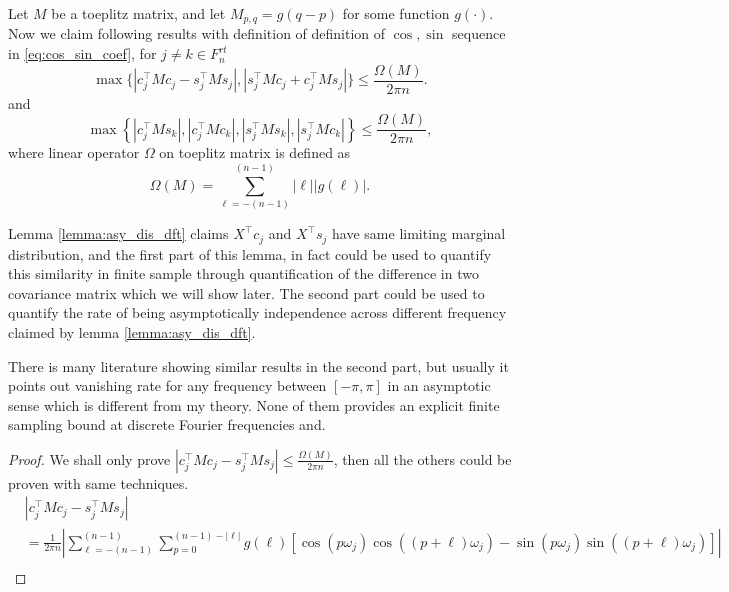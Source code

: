 \begin{lem}
\label{lemma: bound_toeplitz}
Let $M$ be a toeplitz matrix, and let $M_{p,q} = g(q-p)$ for some function $g(\cdot)$. Now we claim following results with definition of definition of $\cos, \sin$ sequence in \ref{eq:cos_sin_coef}, for $j\neq k\in F^{rt}_n$
\begin{equation*}
\max\{|c_j^\top M c_j - s_j^\top M s_j|, |s_j^\top M c_j + c_j^\top M s_j|\}\le \frac{\Omega(M)}{2\pi n}.
\end{equation*}
and 
\begin{equation*}
\max\left\{|c_j^\top M s_k|, |c_j^\top M c_k|, |s_j^\top M s_k|, |s_j^\top M c_k|\right\} \le \frac{\Omega(M)}{2\pi n},
\end{equation*}
where linear operator $\Omega$ on toeplitz matrix is defined as 
\begin{equation}
\Omega(M) = \sum_{\ell = -(n-1)}^{(n-1)} |\ell| |g(\ell)|.   
\end{equation}
\begin{remark}
Lemma \ref{lemma:asy_dis_dft} claims $X^\top c_j$ and $X^\top s_j$ have same limiting marginal distribution, 
and the first part of this lemma, in fact could be used to quantify this similarity in finite sample through quantification of the difference in two covariance matrix
which we will show later. The second part could be used to quantify the rate of being asymptotically independence across different frequency claimed by lemma \ref{lemma:asy_dis_dft}. \par 
There is many literature showing similar results in the second part, but usually it points out vanishing rate for any frequency between $[-\pi, \pi]$ in an asymptotic sense which is different from my theory. None of them provides an explicit finite sampling bound at discrete Fourier frequencies and. 
\end{remark}
\begin{proof}
We shall only prove $|c_j^\top M c_j - s_j^\top M s_j|\le \frac{\Omega(M)}{2\pi n}$, then all the others could be proven with same techniques. %
\begin{equation}
\label{eq:similarity_real_im}
\begin{aligned}
 &|c_j^\top M c_j - s_j^\top M s_j| \\
 &=\frac{1}{2\pi n}\left|\sum_{\ell=-(n-1)}^{(n-1)} \sum_{p=0}^{(n-1)-\left|\ell\right|} g(\ell)\left[ \cos(p\omega_j)\cos((p+\ell)\omega_j) - \sin(p\omega_j)\sin((p+\ell)\omega_j)\right]\right|\\

\end{aligned}
\end{equation}
\end{proof}
\end{lem}
